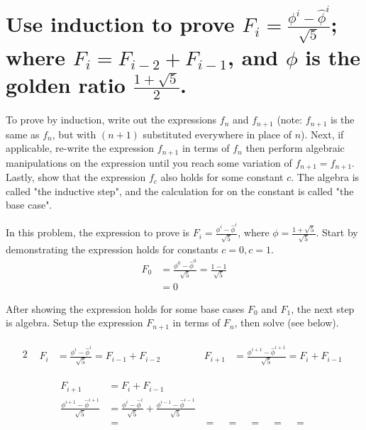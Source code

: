 \section[Problem 2]{Use induction to prove $F_i = \frac{\phi^i - \hat{\phi}^i}{\sqrt{5}}$; where $F_i = F_{i-2} + F_{i-1}$, and $\phi$ is the golden ratio $\frac{1 + \sqrt{5}}{2}$.}

To prove by induction, write out the expressions $f_n$ and $f_{n + 1}$ (note: $f_{n + 1}$ is the same as $f_n$, but with $(n + 1)$ substituted everywhere in place of $n$). Next, if applicable, re-write the expression $f_{n + 1}$ in terms of $f_n$ then perform algebraic manipulations on the expression until you reach some variation of $f_{n + 1} = f_{n + 1}$.  Lastly, show that the expression $f_c$ also holds for some constant $c$. The algebra is called "the inductive step", and the calculation for on the constant is called "the base case".

In this problem, the expression to prove is $F_i = \frac{\phi^i - \hat{\phi}^i}{\sqrt{5}}$, where $\phi = \frac{1 + \sqrt{5}}{\sqrt{5}}$. Start by demonstrating the expression holds for constants $c = 0, c = 1$. 
\begin{align}
	F_0 &= \frac{\phi^0 - \hat{\phi}^0}{\sqrt{5}} = \frac{1 - 1}{\sqrt{5}} \\
		&= 0 
\end{align}

After showing the expression holds for some base cases $F_0$ and $F_1$, the next step is algebra. Setup the expression $F_{n + 1}$ in terms of $F_n$, then solve (see below).

\setcounter{equation}{0}
\begin{alignat*}{2}
	&
	\begin{aligned}
		F_i &= \frac{\phi^i - \hat{\phi}^i}{\sqrt{5}} = F_{i - 1} + F_{i - 2}
	\end{aligned}
	& \qquad &
	\begin{aligned}
		F_{i + 1} &= \frac{\phi^{i + 1} - \hat{\phi}^{i + 1}}{\sqrt{5}} = F_{i} + F_{i - 1}
	\end{aligned}
\end{alignat*}

\begin{align}
	F_{i + 1} &= F_{i} + F_{i - 1} \\
	\frac{\phi^{i + 1} - \hat{\phi}^{i + 1}}{\sqrt{5}} 
	&=  
	\frac{\phi^{i} - \hat{\phi}^{i}}{\sqrt{5}} +
	\frac{\phi^{i - 1} - \hat{\phi}^{i - 1}}{\sqrt{5}} \\
	&=
	\frac{}{} 
	&=
	\frac{}{} 
	&=
	\frac{}{} 
	&=
	\frac{}{} 
	&=
	\frac{}{} 
	&=
	\frac{}{} 
\end{align}

